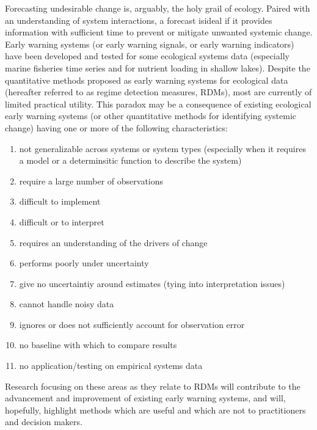 \documentclass[12pt,twoside,openany]{reedthesis}
\providecommand{\tightlist}{%
  \setlength{\itemsep}{0pt}\setlength{\parskip}{0pt}}
\begin{document}
Forecasting undesirable change is, arguably, the holy grail of ecology.
Paired with an understanding of system interactions, a forecast isideal
if it provides information with sufficient time to prevent or mitigate
unwanted systemic change. Early warning systems (or early warning
signals, or early warning indicators) have been developed and tested for
some ecological systems data (especially marine fisheries time series
and for nutrient loading in shallow lakes). Despite the quantitative
methods proposed as early warning systems for ecological data (hereafter
referred to as regime detection measures, RDMs), most are currently of
limited practical utility. This paradox may be a consequence of existing
ecological early warning systems (or other quantitative methods for
identifying systemic change) having one or more of the following
characteristics:
\begin{enumerate}
\def\labelenumi{\arabic{enumi}.}
\tightlist
\item
  not generalizable across systems or system types (especially when it
  requires a model or a determinsitic function to describe the system)
\item
  require a large number of observations\\
\item
  difficult to implement\\
\item
  difficult or to interpret\\
\item
  requires an understanding of the drivers of change\\
\item
  performs poorly under uncertainty
\item
  give no uncertaintiy around estimates (tying into interpretation
  issues)\\
\item
  cannot handle noisy data
\item
  ignores or does not sufficiently account for observation error\\
\item
  no baseline with which to compare results
\item
  no application/testing on empirical systems data
\end{enumerate}
Research focusing on these areas as they relate to RDMs will contribute
to the advancement and improvement of existing early warning systems,
and will, hopefully, highlight methods which are useful and which are
not to practitioners and decision makers.
\end{document}
